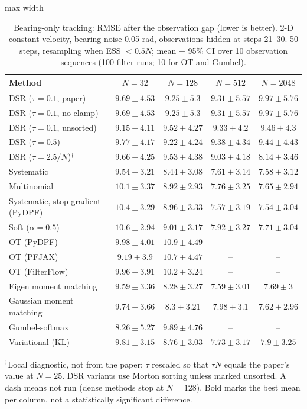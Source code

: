 \begin{table}[H]
\centering
\small
\caption{Bearing-only tracking: RMSE after the observation gap (lower is better). 2-D constant velocity, bearing noise 0.05 rad, observations hidden at steps 21--30. 50 steps, resampling when ESS $<0.5N$; mean $\pm$ 95\% CI over 10 observation sequences (100 filter runs; 10 for OT and Gumbel).}
\label{tab:bearing-post_occlusion_rmse}
\begin{adjustbox}{max width=\linewidth}
\begin{tabular}{lcccc}
\toprule
Method & $N{=}32$ & $N{=}128$ & $N{=}512$ & $N{=}2048$ \\
\midrule
DSR ($\tau{=}0.1$, paper) & $9.69\pm4.53$ & $9.25\pm5.3$ & $9.31\pm5.57$ & $9.97\pm5.76$ \\
DSR ($\tau{=}0.1$, no clamp) & $9.69\pm4.53$ & $9.25\pm5.3$ & $9.31\pm5.57$ & $9.97\pm5.76$ \\
DSR ($\tau{=}0.1$, unsorted) & $9.15\pm4.11$ & $9.52\pm4.27$ & $9.33\pm4.2$ & $9.46\pm4.3$ \\
DSR ($\tau{=}0.5$) & $9.77\pm4.17$ & $9.22\pm4.24$ & $9.38\pm4.34$ & $9.44\pm4.43$ \\
DSR ($\tau{=}2.5/N$)$^\dagger$ & $9.66\pm4.25$ & $9.53\pm4.38$ & $9.03\pm4.18$ & $8.14\pm3.46$ \\
\midrule
Systematic & $9.54\pm3.21$ & $8.44\pm3.08$ & $7.61\pm3.14$ & $7.58\pm3.12$ \\
Multinomial & $10.1\pm3.37$ & $8.92\pm2.93$ & $7.76\pm3.25$ & $7.65\pm2.94$ \\
Systematic, stop-gradient (PyDPF) & $10.4\pm3.29$ & $8.96\pm3.33$ & $\mathbf{7.57\pm3.19}$ & $\mathbf{7.54\pm3.04}$ \\
Soft ($\alpha{=}0.5$) & $10.6\pm2.94$ & $9.01\pm3.17$ & $7.92\pm3.27$ & $7.71\pm3.04$ \\
OT (PyDPF) & $9.98\pm4.01$ & $10.9\pm4.49$ & -- & -- \\
OT (PFJAX) & $9.19\pm3.9$ & $10.7\pm4.47$ & -- & -- \\
OT (FilterFlow) & $9.96\pm3.91$ & $10.2\pm3.24$ & -- & -- \\
Eigen moment matching & $9.59\pm3.36$ & $\mathbf{8.28\pm3.27}$ & $7.59\pm3.01$ & $7.69\pm3$ \\
Gaussian moment matching & $9.74\pm3.66$ & $8.3\pm3.21$ & $7.98\pm3.1$ & $7.62\pm2.96$ \\
Gumbel-softmax & $\mathbf{8.26\pm5.27}$ & $9.89\pm4.76$ & -- & -- \\
Variational (KL) & $9.81\pm3.15$ & $8.76\pm3.03$ & $7.73\pm3.17$ & $7.9\pm3.25$ \\
\bottomrule
\end{tabular}
\end{adjustbox}
\par\smallskip\parbox{0.95\linewidth}{\footnotesize $^\dagger$Local diagnostic, not from the paper: $\tau$ rescaled so that $\tau N$ equals the paper's value at $N{=}25$. DSR variants use Morton sorting unless marked unsorted. A dash means not run (dense methods stop at $N{=}128$). Bold marks the best mean per column, not a statistically significant difference.}
\end{table}

